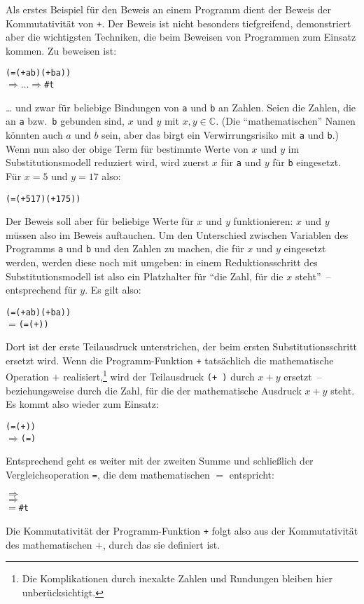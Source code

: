 Als erstes Beispiel für den Beweis an einem Programm dient der Beweis
der Kommutativität von \texttt{+}.  Der Beweis ist nicht besonders
tiefgreifend, demonstriert aber die wichtigsten Techniken, die beim
Beweisen von Programmen zum Einsatz kommen.  Zu beweisen ist:
%
\begin{alltt}
(= (+ a b) (+ b a))
\(\Longrightarrow\ldots\Longrightarrow\) \#t
\end{alltt}
%
\ldots{} und zwar für beliebige Bindungen von \texttt{a} und
\texttt{b} an Zahlen.  Seien die Zahlen, die an \texttt{a} bzw.\
\texttt{b} gebunden sind, $x$ und $y$ mit $x,y\in\mathbb{C}$.  (Die
"`mathematischen"' Namen könnten auch $a$ und $b$ sein, aber das birgt
ein Verwirrungsrisiko mit \texttt{a} und \texttt{b}.)  Wenn nun also
der obige Term für bestimmte Werte von $x$ und $y$ im
Substitutionsmodell reduziert wird, wird zuerst $x$ für \texttt{a} und
$y$ für \texttt{b} eingesetzt.  Für $x=5$ und $y=17$ also:
%
\begin{alltt}
(= (+ 5 17) (+ 17 5))
\end{alltt}
%
Der Beweis soll aber für beliebige Werte für $x$ und $y$
funktionieren: $x$ und $y$ müssen also im Beweis auftauchen.
Um den Unterschied zwischen Variablen des Programms \texttt{a} und
\texttt{b} und den Zahlen zu machen, die für $x$ und $y$ eingesetzt
werden, werden diese noch mit \valof{\_} umgeben: \valof{x} in
einem Reduktionsschritt des Substitutionsmodell ist also ein
Platzhalter für "`die Zahl, für die $x$ steht"'~-- entsprechend für $y$.
Es gilt also:

\begin{alltt}
(= (+ a b) (+ b a))
\(=\) (=  (+  ))
\end{alltt}
%
Dort ist der erste Teilausdruck unterstrichen, der beim ersten
Substitutionsschritt ersetzt wird.  Wenn die Programm-Funktion
\texttt{+} tatsächlich die mathematische Operation $+$
realisiert,\footnote{Die Komplikationen durch inexakte Zahlen und
  Rundungen bleiben hier unberücksichtigt.}
wird der Teilausdruck \texttt{(+  )} durch $x+y$
ersetzt~-- beziehungsweise durch die Zahl, für die der mathematische
Ausdruck $x+y$ steht.  Es kommt also wieder \valof{\_} zum Einsatz:
%
\begin{alltt}
(=  (+  ))
\(\Longrightarrow\) (=  )
\end{alltt}
%
Entsprechend geht es weiter mit der zweiten Summe und schließlich der
Vergleichsoperation \texttt{=}, die dem mathematischen $=$ entspricht:
%
\begin{alltt}
\(\Longrightarrow\) 
\(\Longrightarrow\) 
\(=\) \#t
\end{alltt}
%
Die Kommutativität der Programm-Funktion \texttt{+} folgt also aus der
Kommutativität des mathematischen $+$, durch das sie definiert ist.

